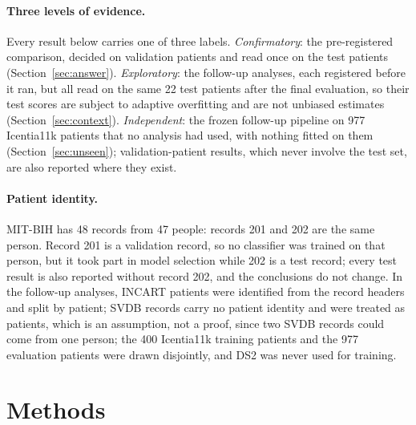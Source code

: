 \documentclass[10pt,a4paper]{article}
\begin{document}
\paragraph{Three levels of evidence.} Every result below carries one of three labels. \emph{Confirmatory}: the pre-registered
comparison, decided on validation patients and read once on the test patients (Section~\ref{sec:answer}). \emph{Exploratory}: the
follow-up analyses, each registered before it ran, but all read on the same 22 test patients after the final evaluation, so their
test scores are subject to adaptive overfitting and are not unbiased estimates (Section~\ref{sec:context}). \emph{Independent}: the
frozen follow-up pipeline on 977 Icentia11k patients that no analysis had used, with nothing fitted on them
(Section~\ref{sec:unseen}); validation-patient results, which never involve the test set, are also reported where they exist.

\paragraph{Patient identity.} MIT-BIH has 48 records from 47 people: records 201 and 202 are the same person. Record 201 is a
validation record, so no classifier was trained on that person, but it took part in model selection while 202 is a test record; every
test result is also reported without record 202, and the conclusions do not change. In the follow-up analyses, INCART patients were
identified from the record headers and split by patient; SVDB records carry no patient identity and were treated as patients, which is an assumption, not a proof, since two SVDB
records could come from one person; the
400 Icentia11k training patients and the 977 evaluation patients were drawn disjointly, and DS2 was never used for training.

\section{Methods}\label{sec:methods}
\end{document}
